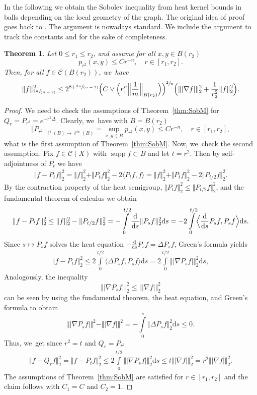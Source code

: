 \documentclass[JEP,XML,SOM,Unicode,published]{cedram}
\newcommand{\spfrac}[2]{\sfrac{#1}{(#2)}}
\theoremstyle{plain}
\newtheorem{theorem}{Theorem}[section]
\theoremstyle{definition}
\newcommand{\cC}{\mathcal{C}}
\newcommand{\drm}{\mathrm{d}}
\DeclareMathOperator{\supp}{supp}
\let\oldint\int
\renewcommand{\int}{\oldint\limits}
\begin{document}
In the following we obtain the Sobolev inequality from heat kernel bounds in balls depending on the local geometry of the graph. The original idea of proof goes back to \cite{Varopoulos-85}. The argument is nowadays standard. We include the argument to track the constants and for the sake of completeness.

\begin{theorem}\label{lem:heattoS}
Let $0\leq r_1\leq r_2$, and assume for all $x,y\in B(r_2)$
\[
p_{r^2}(x,y)\leq Cr^{-n}, \quad r\in [r_1,r_2].
\]
Then, for all {$f\in\cC( B(r_{2}))$}, we~have
\begin{align*}
\Vert f\Vert_{\spfrac{2n}{n-2}}^2
\leq 2^{8+\spfrac{2n}{n-2}}
\Bigl(C\vee \Bigl(r_1^{n} \Bigl\Vert\frac1m\Bigr\Vert_{B(r_2)}\Bigr)\Bigr)^{\sfrac{2}{n}}
\Bigl(\Vert \vert\nabla f\vert\Vert_2^2+\frac{1}{r_2^2}\Vert f\Vert_2^2\Bigr).
\end{align*}
\end{theorem}
\begin{proof}
We need to check the assumptions of Theorem~\ref{thm:SobM} for $Q_r=P_{r^{2}}=e^{-r^2\Delta}$.
Clearly, we~have with $ B=B(r_2) $
\[
\Vert P_{r^2}\Vert_{\ell^1(B)\to\ell^\infty(B)}=\sup_{x,y\in B}p_{r^2}(x,y)\leq C r^{-n}, \quad r\in [r_1,r_2],
\]
what is the first assumption of Theorem~\ref{thm:SobM}.
Now, we~check the second assumption. Fix $f\in \cC(X)$ with $\supp f\subset B$ and let $ t=r^{2} $. Then by self-adjointness of $P_t$
we have
\begin{align*}
\Vert f-P_tf\Vert_2^2=\Vert f\Vert_2^2+\Vert P_tf\Vert_2^2-2\langle P_tf,f\rangle
=\Vert f\Vert_2^2+\Vert P_tf\Vert_2^2-2\Vert P_{t/2}f\Vert_2^2.
\end{align*}
By the contraction property of the heat semigroup, \ie $\Vert P_tf\Vert_2^2\leq \Vert P_{t/2}f\Vert_2^2$, and the fundamental theorem of calculus we obtain
\begin{align*}
\Vert f-P_tf\Vert_2^2
\leq \Vert f\Vert_2^2-\Vert P_{t/2}f\Vert_2^2=-\int_0^{t/2}\frac{\drm }{\drm s}\Vert P_sf\Vert_2^2\drm s
=-2\int_0^{t/2}\Bigl\langle \frac{\drm }{\drm s}P_sf,P_sf\Bigr\rangle\drm s.
\end{align*}
Since $s\mapsto P_sf$ solves the heat equation $ -\frac{\drm }{\drm s}P_sf=\Delta P_sf $, Green's formula yields
\begin{align*}
\Vert f-P_tf\Vert_2^2
\leq
2\int_0^{t/2}\langle \Delta P_sf,P_sf\rangle\drm s
=2\int_0^{t/2}\Vert |\nabla P_sf |\Vert_2^2\drm s,
\end{align*}
Analogously, the inequality
\[
\Vert |\nabla P_sf|\Vert_2^2\leq \Vert|\nabla f|\Vert_2^2
\]
can be seen by using the fundamental theorem, the heat equation, and Green's formula to obtain
\[
\Vert |\nabla P_sf|\Vert^2- \Vert|\nabla f|\Vert^2
=-\int_0^s \Vert \Delta P_sf\Vert_2^2\drm s
\leq 0.
\]
Thus, we~get since $r^{2}=t$ and $ Q_{r}=P_{r^{2}} $
\begin{align*}
\Vert f-Q_{r}f\Vert_2^2=\Vert f-P_{t}f\Vert_2^2
\leq
2\int_0^{t/2}\Vert |\nabla P_sf|\Vert_2^2\drm s
\leq t\Vert |\nabla f|\Vert_2^2=r^2\Vert |\nabla f|\Vert_2^2.
\end{align*}
The assumptions of {Theorem~\ref{thm:SobM}} are satisfied for $r\in[r_1,r_2]$ and the claim follows with $C_1=C$ and $C_2=1$.
\end{proof}
\end{document}
